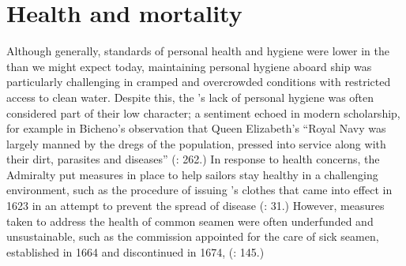 \section{{Health and mortality}  }\label{sec:3.5}

Although generally, standards of personal health and hygiene were lower in the  than we might expect today, maintaining personal hygiene aboard ship was particularly challenging in cramped and overcrowded conditions with restricted access to clean water. Despite this, the ’s lack of personal hygiene was often considered part of their low character; a sentiment echoed in modern scholarship, for example in Bicheno’s observation that Queen Elizabeth’s “Royal Navy was largely manned by the dregs of the population, pressed into service along with their dirt, parasites and diseases” (\citeyear*{Bicheno2012}: 262.) In response to health concerns, the Admiralty put measures in place to help sailors stay healthy in a challenging environment, such as the procedure of issuing ’s clothes that came into effect in 1623 in an attempt to prevent the spread of disease (\citealt{Brown2011}: 31.) However, measures taken to address the health of common seamen were often underfunded and unsustainable, such as the commission appointed for the care of sick seamen, established in 1664 and discontinued in 1674, (\citealt{Lincoln2015}: 145.)

